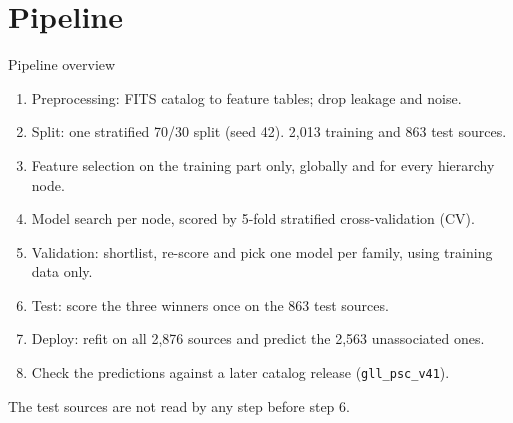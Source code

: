 \documentclass[aspectratio=169, 10pt]{beamer}
\newcommand{\cls}[1]{\texttt{#1}}
\begin{document}
\section{Pipeline}

\begin{frame}{Pipeline overview}
  \begin{enumerate}\small
    \item Preprocessing: FITS catalog to feature tables; drop leakage and noise.
    \item Split: one stratified 70/30 split (seed 42). 2,013 training and 863 test sources.
    \item Feature selection on the training part only, globally and for every hierarchy node.
    \item Model search per node, scored by 5-fold stratified cross-validation (CV).
    \item Validation: shortlist, re-score and pick one model per family, using training data only.
    \item Test: score the three winners once on the 863 test sources.
    \item Deploy: refit on all 2,876 sources and predict the 2,563 unassociated ones.
    \item Check the predictions against a later catalog release (\cls{gll\_psc\_v41}).
  \end{enumerate}
  \vspace{0.2cm}
  \small The test sources are not read by any step before step 6.
\end{frame}
\end{document}
